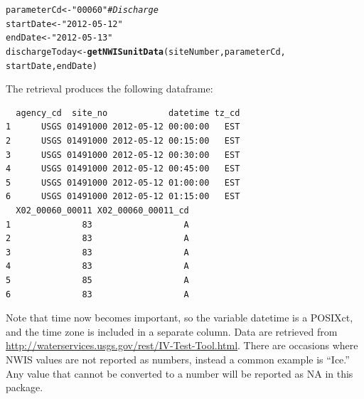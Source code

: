 \documentclass[a4paper,11pt]{article}\usepackage[]{graphicx}\usepackage[]{color}
\makeatletter
\newcommand{\hlstr}[1]{\textcolor[rgb]{0.192,0.494,0.8}{#1}}%
\newcommand{\hlcom}[1]{\textcolor[rgb]{0.678,0.584,0.686}{\textit{#1}}}%
\newcommand{\hlstd}[1]{\textcolor[rgb]{0.345,0.345,0.345}{#1}}%
\newcommand{\hlkwb}[1]{\textcolor[rgb]{0.69,0.353,0.396}{#1}}%
\newcommand{\hlkwd}[1]{\textcolor[rgb]{0.737,0.353,0.396}{\textbf{#1}}}%
\newenvironment{kframe}{%
 \def\at@end@of@kframe{}%
 \ifinner\ifhmode%
  \def\at@end@of@kframe{\end{minipage}}%
  \begin{minipage}{\columnwidth}%
 \fi\fi%
 \def\FrameCommand##1{\hskip\@totalleftmargin \hskip-\fboxsep
 \colorbox{shadecolor}{##1}\hskip-\fboxsep
     \hskip-\linewidth \hskip-\@totalleftmargin \hskip\columnwidth}%
 \MakeFramed {\advance\hsize-\width
   \@totalleftmargin\z@ \linewidth\hsize
   \@setminipage}}%
 {\par\unskip\endMakeFramed%
 \at@end@of@kframe}
\newenvironment{knitrout}{}{} %
\makeatother
\begin{document}
\begin{knitrout}
\color{fgcolor}\begin{kframe}
\begin{alltt}
\hlstd{parameterCd} \hlkwb{<-} \hlstr{"00060"}  \hlcom{# Discharge}
\hlstd{startDate} \hlkwb{<-} \hlstr{"2012-05-12"}
\hlstd{endDate} \hlkwb{<-} \hlstr{"2012-05-13"}
\hlstd{dischargeToday} \hlkwb{<-} \hlkwd{getNWISunitData}\hlstd{(siteNumber, parameterCd,}
        \hlstd{startDate, endDate)}
\end{alltt}
\end{kframe}
\end{knitrout}

The retrieval produces the following dataframe:

\begin{knitrout}
\color{fgcolor}\begin{kframe}
\begin{verbatim}
  agency_cd  site_no            datetime tz_cd
1      USGS 01491000 2012-05-12 00:00:00   EST
2      USGS 01491000 2012-05-12 00:15:00   EST
3      USGS 01491000 2012-05-12 00:30:00   EST
4      USGS 01491000 2012-05-12 00:45:00   EST
5      USGS 01491000 2012-05-12 01:00:00   EST
6      USGS 01491000 2012-05-12 01:15:00   EST
  X02_00060_00011 X02_00060_00011_cd
1              83                  A
2              83                  A
3              83                  A
4              83                  A
5              85                  A
6              83                  A
\end{verbatim}
\end{kframe}
\end{knitrout}

Note that time now becomes important, so the variable datetime is a POSIXct, and the time zone is included in a separate column. Data are retrieved from \url{http://waterservices.usgs.gov/rest/IV-Test-Tool.html}. There are occasions where NWIS values are not reported as numbers, instead a common example is \enquote{Ice.}  Any value that cannot be converted to a number will be reported as NA in this package.

\newpage


\FloatBarrier

\end{document}
